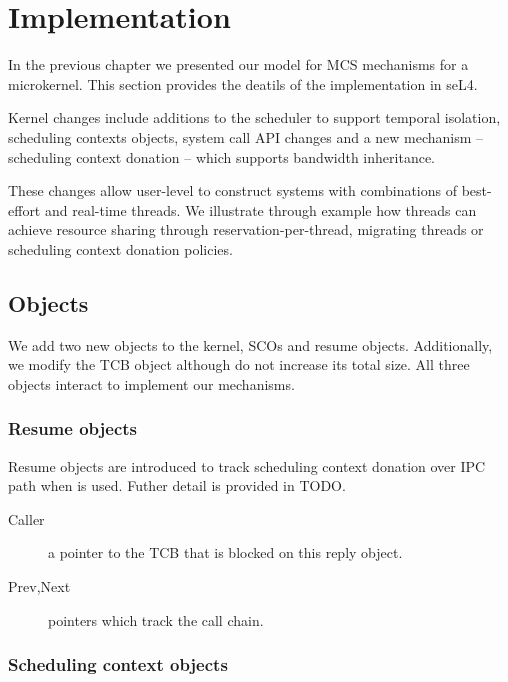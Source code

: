 \chapter{Implementation}
\label{chap:implementation}


In the previous chapter we presented our model for MCS mechanisms for a microkernel.
This section provides the deatils of the implementation in seL4.


Kernel changes include additions to the scheduler to support temporal isolation, scheduling contexts
objects, system call API changes and a new mechanism -- scheduling context donation -- which supports bandwidth inheritance.

These changes allow user-level to construct systems with combinations of best-effort and real-time threads.
We illustrate through example how threads can achieve resource sharing through reservation-per-thread, migrating threads or scheduling context donation policies.



\section{Objects}

We add two new objects to the kernel, \glspl{SCO} and resume objects. Additionally, we modify
the \gls{TCB} object although do not increase its total size. All three objects interact to
implement our mechanisms.

\subsection{Resume objects}
\label{s:resume}

Resume objects are introduced to track scheduling context donation over IPC path when \call is
used. Futher detail is provided in TODO.

\begin{description}
    \item[Caller] a pointer to the \gls{TCB} that is blocked on this reply object.
    \item[Prev,Next] pointers which track the call chain.
\end{description}

\subsection{Scheduling context objects}
\label{s:sco}


